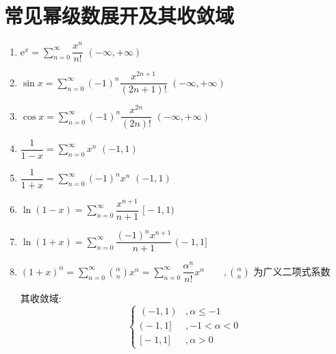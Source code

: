 \documentclass[UTF8]{ctexart}
\newcommand{\E}{\mathrm e}
\begin{document}
\section{常见幂级数展开及其收敛域}
\begin{framed}
    \begin{enumerate}
        \item $\displaystyle \E^x = \sum_{n = 0}^{\infty} \dfrac{x^n}{n!} $ \hspace{2em} $ (-\infty, +\infty) $
        \item $\displaystyle \sin x = \sum_{n = 0}^{\infty} (-1)^n\dfrac{x^{2n + 1}}{(2n + 1)!} $ \hspace{2em} $ (-\infty, +\infty) $
        \item $\displaystyle \cos x = \sum_{n = 0}^{\infty} (-1)^n \dfrac{x^{2n}}{(2n)!} $ \hspace{2em} $ (-\infty, +\infty) $
        \item $\displaystyle \dfrac{1}{1 - x} = \sum_{n = 0}^{\infty} x^n $ \hspace{2em} $ (-1, 1) $
        \item $\displaystyle \dfrac{1}{1 + x} = \sum_{n = 0}^{\infty} (-1)^n x^n  $ \hspace{2em} $ (-1, 1) $
        \item $\displaystyle \ln(1 - x) = \sum_{n = 0}^{\infty} \dfrac{x^{n+1}}{n + 1}  $ \hspace{2em} $ \big[-1, 1\big) $
        \item $\displaystyle \ln(1 + x) = \sum_{n = 0}^{\infty} \dfrac{(-1)^{n} x^{n+1}}{n + 1}  $ \hspace{2em} $ \big(-1 ,1\big] $
        \item $\displaystyle (1 + x)^\alpha = \sum_{n = 0}^{\infty} \binom{\alpha}{n} x^n = \sum_{n = 0}^{\infty} \dfrac{\alpha^{\underline{n}}}{n!} x^n \qquad ,\binom{\alpha}{n} \text{ 为广义二项式系数} $
        
        其收敛域:\[ \begin{cases}
            (-1, 1) &, \alpha \leqslant -1 \\
            \big( -1, 1 \big] &, -1 < \alpha < 0 \\
            \big[ -1, 1 \big] &, \alpha > 0
        \end{cases} \]
    \end{enumerate}
\end{framed}
\end{document}

